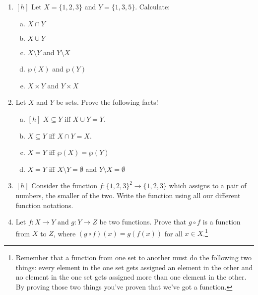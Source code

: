 	\begin{enumerate}[\thesection.1]
	
		\item $[h]$ Let $X=\{1,2,3\}$ and $Y=\{1,3,5\}$. Calculate:
		
		\begin{enumerate}[(a)]
							
				\item $X\cap Y$
				
				\item $X\cup Y$
				
				\item $X\setminus Y$ and $Y\setminus X$
				
				\item $\wp(X)$ and $\wp(Y)$
				
				\item $X\times Y$ and $Y\times X$
							
			\end{enumerate}
	
		\item Let $X$ and $Y$ be sets. Prove the following facts!
		
			\begin{enumerate}[(a)]
							
				\item $[h]$ $X\subseteq Y$ iff $X\cup Y=Y$.
				
				\item $X\subseteq Y$ iff $X\cap Y=X$.
				
				\item $X=Y$ iff $\wp(X)=\wp(Y)$
				
				\item $X=Y$ iff $X\setminus Y=\emptyset$ and $Y\setminus X=\emptyset$
			
			\end{enumerate}
					
		\item $[h]$ Consider the function $f:\{1,2,3\}^2\to \{1,2,3\}$ which assigns to a pair of numbers, the smaller of the two. Write the function using all our different function notations.
		
		\item Let $f:X\to Y$ and $g:Y\to Z$ be two functions. Prove that $g\circ f$ is a function from $X$ to $Z$, where $(g\circ f)(x)=g(f(x))$ for all $x\in X$.\footnote{Remember that a function from one set to another must do the following two things: every element in the one set gets assigned an element in the other and no element in the one set gets assigned more than one element in the other. By proving those two things you've proven that we've got a function.}
		

\end{enumerate}
